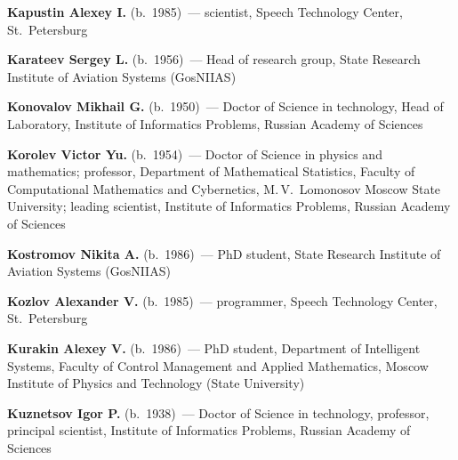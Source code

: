 \begin{multicols}{2}
\vspace*{6pt}

\noindent
\textbf{Kapustin Alexey I.} (b.\ 1985)~--- scientist, Speech Technology Center, St.~Petersburg

\vspace*{6pt}

\noindent
\textbf{Karateev Sergey L.}  (b.\ 1956)~--- Head of research group, 
State Research Institute of Aviation Systems \mbox{(GosNIIAS)}

\vspace*{6pt}

\noindent
\textbf{Konovalov Mikhail G.} (b.\ 1950)~--- Doctor of Science in technology, 
Head of Laboratory, Institute of Informatics Problems,  Russian Academy of Sciences

\vspace*{6pt}

\noindent
\textbf{Korolev Victor Yu.}  (b.\ 1954)~--- Doctor of Science in physics and mathematics;
professor, Department of Mathematical Statistics, 
Faculty of Computational Mathematics and Cybernetics, M.\,V.~Lomonosov Moscow State University;
leading scientist, Institute of Informatics Problems, Russian Academy of Sciences


\vspace*{6pt}

\noindent
\textbf{Kostromov Nikita A.} (b.\ 1986)~--- PhD student, State Research Institute 
of Aviation Systems (GosNIIAS)


\columnbreak

\noindent
\textbf{Kozlov Alexander V.} (b.\ 1985)~--- programmer,
 Speech Technology Center, St.~Pe\-ters\-burg

\vspace*{5pt}

\noindent
\textbf{Kurakin Alexey V.} (b.\ 1986)~--- PhD student, Department of Intelligent Systems, 
Faculty of Control Management and Applied Mathematics, Moscow Institute of Physics and 
Technology (State University)

\vspace*{5pt}

\noindent
\textbf{Kuznetsov Igor P.} (b.\ 1938)~--- Doctor of Science in technology, 
professor, principal scientist, Institute of Informatics Problems, Russian Academy of Sciences

\vspace*{5pt}


\end{multicols}
